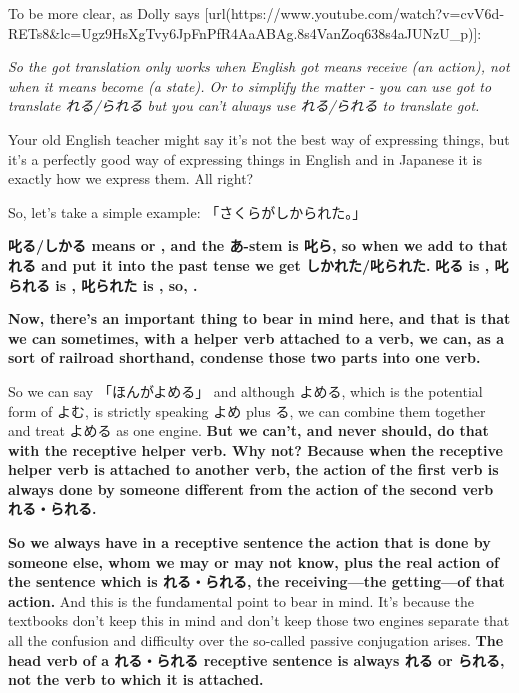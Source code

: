 To be more clear, as Dolly says [url(https://www.youtube.com/watch?v=cvV6d-RETs8&lc=Ugz9HsXgTvy6JpFnPfR4AaABAg.8s4VanZoq638s4aJUNzU_p)]:

{\em So the got translation only works when English got means receive (an action), not when it means become (a state). Or to simplify the matter - you can use got to translate れる/られる but you can't always use れる/られる to translate got.}

Your old English teacher might say it's not the best way of expressing things, but it's a perfectly good way of expressing things in English and in Japanese it is exactly how we express them. All right?

So, let's take a simple example: 「さくらがしかられた。」

{}

{\bf 叱る/しかる means  or , and the あ-stem is 叱ら, so when we add to that れる and put it into the past tense we get しかれた/叱られた.} {\bf 叱る is , 叱られる is , 叱られた is , so, .}

\thinrule

{\bf Now, there's an important thing to bear in mind here, and that is that we can sometimes, with a helper verb attached to a verb, we can, as a sort of railroad shorthand, condense those two parts into one verb.}

{}

So we can say 「ほんがよめる」 and although よめる, which is the potential form of よむ, is strictly speaking よめ plus る, we can combine them together and treat よめる as one engine. {\bf But we can't, and never should, do that with the receptive helper verb. Why not? Because when the receptive helper verb is attached to another verb, the action of the first verb is always done by someone different from the action of the second verb れる・られる.}

{}

{\bf So we always have in a receptive sentence the action that is done by someone else, whom we may or may not know, plus the real action of the sentence which is れる・られる, the receiving---the getting---of that action.} And this is the fundamental point to bear in mind. It's because the textbooks don't keep this in mind and don't keep those two engines separate that all the confusion and difficulty over the so-called passive conjugation arises. {\bf The head verb of a れる・られる receptive sentence is always れる or られる, not the verb to which it is attached.}

